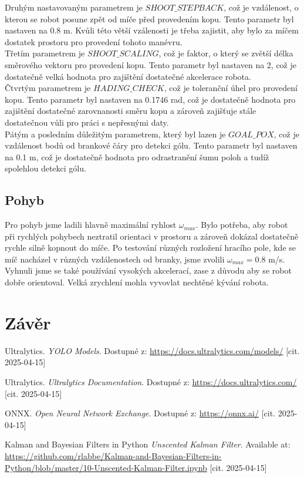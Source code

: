 \documentclass[a4paper,12pt]{article}
\begin{document}
Druhým nastavovaným parametrem je $SHOOT\_STEPBACK$, což je vzdálenost, o kterou se robot posune zpět od míče před provedením kopu. Tento parametr byl nastaven na 0.8 m. Kvůli této větší vzálenosti je třeba zajistit, aby bylo za míčem dostatek prostoru pro provedení tohoto manévru.\\
Třetím parametrem je $SHOOT\_SCALING$, což je faktor, o který se zvětší délka směrového vektoru pro provedení kopu. Tento parametr byl nastaven na 2, což je dostatečně velká hodnota pro zajištění dostatečné akcelerace robota.\\
Čtvrtým parametrem je $HADING\_CHECK$, což je toleranční úhel pro provedení kopu. Tento parametr byl nastaven na 0.1746 rad, což je dostatečně hodnota pro zajištění dostatečné zarovnanosti směru kopu a zároveň zajišťuje stále dostatečnou vůli pro práci s nepřesnými daty.\\
Pátým a posledním důležitým parametrem, který byl lazen je $GOAL\_POX$, což je vzdálenost bodů od brankové čáry pro detekci gólu. Tento parametr byl nastaven na 0.1 m, což je dostatečně hodnota pro odrastranění šumu poloh a tudíž spolehlou detekci gólu.\\

\subsection{Pohyb}
Pro pohyb jsme ladili hlavně maximální ryhlost $\omega_{max}$. Bylo potřeba, aby robot při rychlých pohybech neztratil orientaci v prostoru a zároveň dokázal dostatečně rychle silně kopnout do míče. Po testování různých rozložení hracího pole, kde se míč nacházel v různých vzdálenostech od branky, jsme zvolili $\omega_{max} = 0.8$ m/s.
Vyhnuli jsme se také používání vysokých akcelerací, zase z důvodu aby se robot dobře orientoval. Velká zrychlení mohla vyvovlat nechtěné kývání robota.
\section{Závěr}



\begin{thebibliography}{5}

    Ultralytics. \emph{YOLO Models}. Dostupné z: \url{https://docs.ultralytics.com/models/} [cit. 2025-04-15]
    
    Ultralytics. \emph{Ultralytics Documentation}. Dostupné z: \url{https://docs.ultralytics.com/} [cit. 2025-04-15]
    
    ONNX. \emph{Open Neural Network Exchange}. Dostupné z: \url{https://onnx.ai/} [cit. 2025-04-15]

    Kalman and Bayesian Filters in Python \emph{Unscented Kalman Filter}. Available at: \url{https://github.com/rlabbe/Kalman-and-Bayesian-Filters-in-Python/blob/master/10-Unscented-Kalman-Filter.ipynb} [cit. 2025-04-15]
    
    \end{thebibliography}
\end{document}
